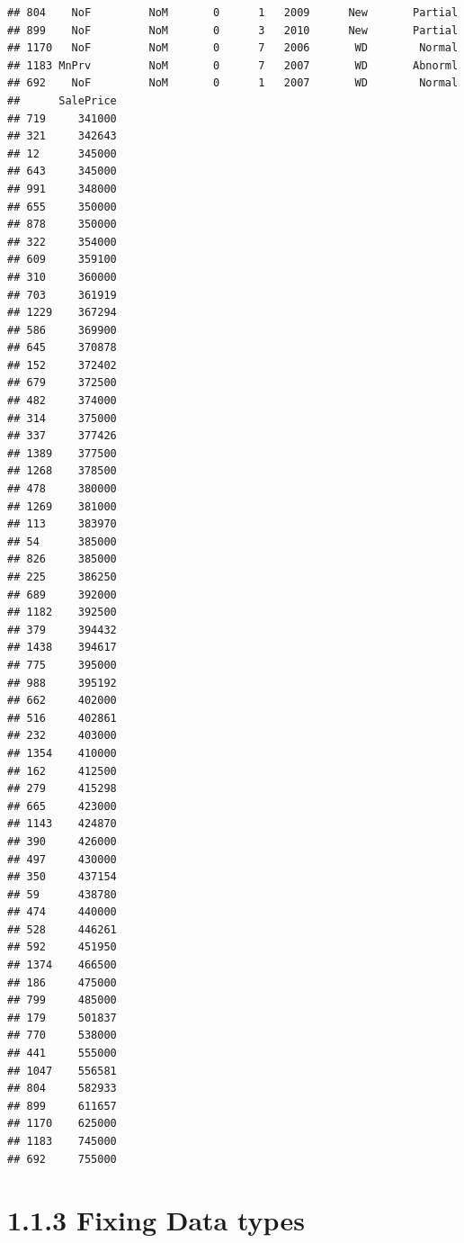 \documentclass[]{article}
\begin{document}
\begin{verbatim}
## 804    NoF         NoM       0      1   2009      New       Partial
## 899    NoF         NoM       0      3   2010      New       Partial
## 1170   NoF         NoM       0      7   2006       WD        Normal
## 1183 MnPrv         NoM       0      7   2007       WD       Abnorml
## 692    NoF         NoM       0      1   2007       WD        Normal
##      SalePrice
## 719     341000
## 321     342643
## 12      345000
## 643     345000
## 991     348000
## 655     350000
## 878     350000
## 322     354000
## 609     359100
## 310     360000
## 703     361919
## 1229    367294
## 586     369900
## 645     370878
## 152     372402
## 679     372500
## 482     374000
## 314     375000
## 337     377426
## 1389    377500
## 1268    378500
## 478     380000
## 1269    381000
## 113     383970
## 54      385000
## 826     385000
## 225     386250
## 689     392000
## 1182    392500
## 379     394432
## 1438    394617
## 775     395000
## 988     395192
## 662     402000
## 516     402861
## 232     403000
## 1354    410000
## 162     412500
## 279     415298
## 665     423000
## 1143    424870
## 390     426000
## 497     430000
## 350     437154
## 59      438780
## 474     440000
## 528     446261
## 592     451950
## 1374    466500
## 186     475000
## 799     485000
## 179     501837
## 770     538000
## 441     555000
## 1047    556581
## 804     582933
## 899     611657
## 1170    625000
## 1183    745000
## 692     755000
\end{verbatim}

\section{1.1.3 Fixing Data types}\label{fixing-data-types}
\end{document}

